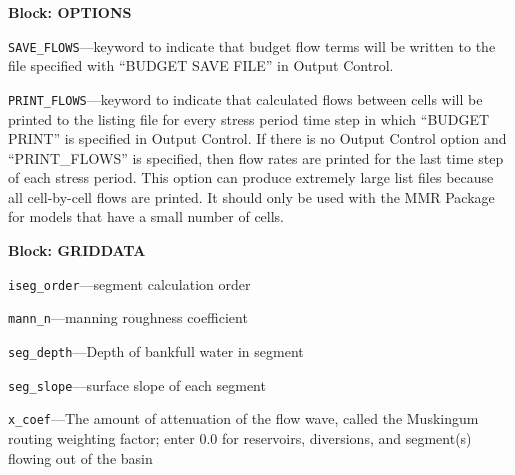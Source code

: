 
\item \textbf{Block: OPTIONS}

\begin{description}
\item \texttt{SAVE\_FLOWS}---keyword to indicate that budget flow terms will be written to the file specified with ``BUDGET SAVE FILE'' in Output Control.

\item \texttt{PRINT\_FLOWS}---keyword to indicate that calculated flows between cells will be printed to the listing file for every stress period time step in which ``BUDGET PRINT'' is specified in Output Control. If there is no Output Control option and ``PRINT\_FLOWS'' is specified, then flow rates are printed for the last time step of each stress period.  This option can produce extremely large list files because all cell-by-cell flows are printed.  It should only be used with the MMR Package for models that have a small number of cells.

\end{description}
\item \textbf{Block: GRIDDATA}

\begin{description}
\item \texttt{iseg\_order}---segment calculation order

\item \texttt{mann\_n}---manning roughness coefficient

\item \texttt{seg\_depth}---Depth of bankfull water in segment

\item \texttt{seg\_slope}---surface slope of each segment

\item \texttt{x\_coef}---The amount of attenuation of the flow wave, called the Muskingum routing weighting factor; enter 0.0 for reservoirs, diversions, and segment(s) flowing out of the basin

\end{description}

